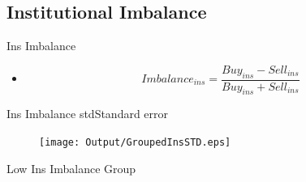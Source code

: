 \documentclass[handout]{beamer}
\begin{document}
%				

	
	
\subsection{Institutional Imbalance}
\begin{frame}{Ins Imbalance}

\begin{itemize}
	\item \cite{seasholes2007predictable}
	
		\begin{equation*}
			Imbalance_{ins} = \frac{Buy_{ins} - Sell_{ins}}{Buy_{ins} + Sell_{ins}}
		\end{equation*}
	\begin{table}[htbp]
		\centering
		\resizebox{0.8\textwidth}{!}{
			
		}
		\label{tab:ImbalanceInsMeanSummary}
	\end{table}
		
	
	
\end{itemize}

\end{frame}


\begin{frame}{Ins Imbalance std}{Standard error}
	\begin{table}[htbp]
		\centering
		\resizebox{0.85\textwidth}{!}{
			
		}
		\label{tab:ImbalanceInsStdSummary}
	\end{table}



\begin{figure}[htbp]
	\centering
	\texttt{[image: Output/GroupedInsSTD.eps]}
	\label{fig:GroupedInsSTD}
\end{figure}
\end{frame}
\begin{frame}{Low Ins Imbalance Group}


				\begin{table}[htbp]
			\centering
			\resizebox{0.8\textwidth}{!}{
				
			}
		\end{table}
	
	\end{frame}
\end{document}
